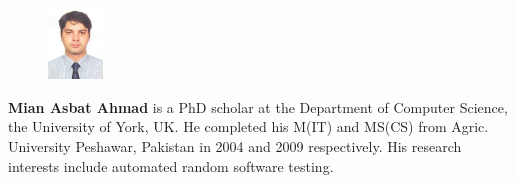 \documentclass[conference]{IEEEtran}
\begin{document}










\newpage



\begin{figure}
  \vspace{-16pt}
  \begin{center}
    \includegraphics[width=0.13\textwidth]{mian.jpg}
  \end{center}
  \vspace{-16pt}

\end{figure}
\noindent\textbf{Mian Asbat Ahmad} is a PhD scholar at the Department of Computer Science, the University of York, UK. He completed his M(IT) and MS(CS) from Agric. University Peshawar, Pakistan in 2004 and 2009 respectively. His research interests include automated random software testing.
\end{document}
